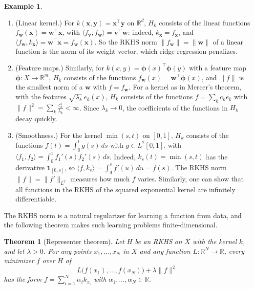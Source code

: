 \documentclass[11pt]{article}
\newcommand{\norm}[1]{\lVert #1 \rVert}
\newcommand{\ip}[2]{\langle #1, #2 \rangle}
\theoremstyle{definition}
\newtheorem{example}[definition]{Example}
\theoremstyle{plain}
\newtheorem{theorem}[definition]{Theorem}
\theoremstyle{remark}
\begin{document}
\begin{example}\label{ex:rkhs}
    \begin{enumerate}
        \item (Linear kernel.) For $k(\mathbf{x}, \mathbf{y}) = \mathbf{x}^\top\mathbf{y}$ on $\mathbb{R}^d$, $H_k$ consists of the linear functions $f_{\mathbf{w}}(\mathbf{x}) = \mathbf{w}^\top\mathbf{x}$, with $\ip{f_{\mathbf{v}}}{f_{\mathbf{w}}} = \mathbf{v}^\top\mathbf{w}$: indeed, $k_{\mathbf{x}} = f_{\mathbf{x}}$, and $\ip{f_{\mathbf{w}}}{k_{\mathbf{x}}} = \mathbf{w}^\top\mathbf{x} = f_{\mathbf{w}}(\mathbf{x})$. So the RKHS norm $\norm{f_{\mathbf{w}}} = \norm{\mathbf{w}}$ of a linear function is the norm of its weight vector, which ridge regression penalizes.
        \item (Feature maps.) Similarly, for $k(x, y) = \boldsymbol{\phi}(x)^\top\boldsymbol{\phi}(y)$ with a feature map $\boldsymbol{\phi}: X \to \mathbb{R}^m$, $H_k$ consists of the functions $f_{\mathbf{w}}(x) = \mathbf{w}^\top\boldsymbol{\phi}(x)$, and $\norm{f}$ is the smallest norm of a $\mathbf{w}$ with $f = f_{\mathbf{w}}$. For a kernel as in Mercer's theorem, with the features $\sqrt{\lambda_k}\,e_k(x)$, $H_k$ consists of the functions $f = \sum_k c_ke_k$ with $\norm{f}^2 = \sum_k \frac{c_k^2}{\lambda_k} < \infty$. Since $\lambda_k \to 0$, the coefficients of the functions in $H_k$ decay quickly.
        \item (Smoothness.) For the kernel $\min(s, t)$ on $[0, 1]$, $H_k$ consists of the functions $f(t) = \int_0^t g(s)\, ds$ with $g \in L^2[0, 1]$, with $\ip{f_1}{f_2} = \int_0^1 f_1'(s)f_2'(s)\, ds$. Indeed, $k_s(t) = \min(s, t)$ has the derivative $\mathbf{1}_{[0, s]}$, so $\ip{f}{k_s} = \int_0^s f'(u)\, du = f(s)$. The RKHS norm $\norm{f} = \norm{f'}_{L^2}$ measures how much $f$ varies. Similarly, one can show that all functions in the RKHS of the squared exponential kernel are infinitely differentiable.
    \end{enumerate}
\end{example}

The RKHS norm is a natural regularizer for learning a function from data, and the following theorem makes such learning problems finite-dimensional.

\begin{theorem}[Representer theorem]\label{thm:representer}
    Let $H$ be an RKHS on $X$ with the kernel $k$, and let $\lambda > 0$. For any points $x_1, \ldots, x_N$ in $X$ and any function $L: \mathbb{R}^N \to \mathbb{R}$, every minimizer $f$ over $H$ of
    \[L\big(f(x_1), \ldots, f(x_N)\big) + \lambda\norm{f}^2\]
    has the form $f = \sum_{i=1}^N \alpha_ik_{x_i}$ with $\alpha_1, \ldots, \alpha_N \in \mathbb{R}$.
\end{theorem}
\end{document}

